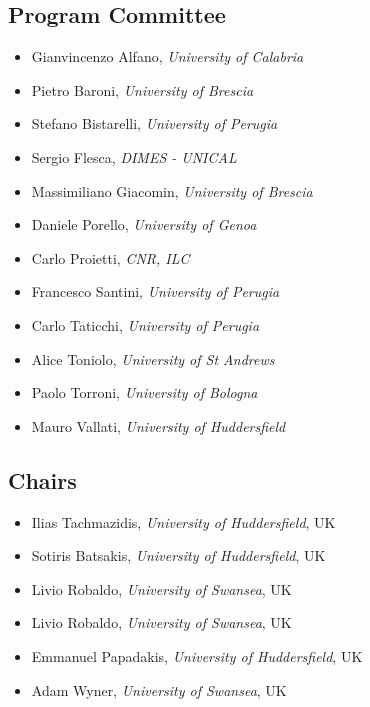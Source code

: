 \documentclass[
]{ceurart}
\begin{document}
\subsection*{Program Committee}
\begin{itemize}
  \item Gianvincenzo Alfano, \emph{University of Calabria}
  \item Pietro Baroni, \emph{University of Brescia}
  \item Stefano Bistarelli, \emph{University of Perugia}
  \item Sergio Flesca, \emph{DIMES - UNICAL}
  \item Massimiliano Giacomin, \emph{University of Brescia}
  \item Daniele Porello, \emph{University of Genoa}
  \item Carlo Proietti, \emph{CNR, ILC}
  \item Francesco Santini, \emph{University of Perugia}
  \item Carlo Taticchi, \emph{University of Perugia}
  \item Alice Toniolo, \emph{University of St Andrews}
  \item Paolo Torroni, \emph{University of Bologna}
  \item Mauro Vallati, \emph{University of Huddersfield}
\end{itemize}



\subsection*{Chairs}
\begin{itemize}
\item Ilias Tachmazidis, \emph{University of Huddersfield}, UK

\item Sotiris Batsakis, \emph{University of Huddersfield}, UK

\item Livio Robaldo, \emph{University of Swansea}, UK

\item Livio Robaldo, \emph{University of Swansea}, UK

\item Emmanuel Papadakis, \emph{University of Huddersfield}, UK

\item Adam Wyner, \emph{University of Swansea}, UK
\end{itemize}
\end{document}
